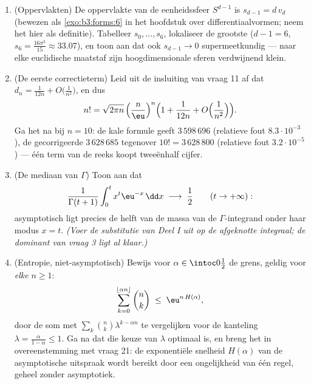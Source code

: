 \begin{problem}
\begin{enumerate}[resume]
        voor $\alpha \neq \frac12$ (zodat binomiaalcoëfficiënten
        buiten het midden exponentieel verwaarloosbaar zijn ten
        opzichte van $2^n$).
  \item (Oppervlakten) De oppervlakte van de eenheidssfeer
        $S^{d-1}$ is $s_{d-1} = d\,v_d$ (bewezen als
        \cref{exo:b3:forms:6} in het hoofdstuk over
        differentiaalvormen; neem het hier als definitie).
        Tabelleer $s_0, \dots, s_6$, lokaliseer de grootste ($d -
        1 = 6$, $s_6 = \frac{16\pi^3}{15} \approx 33.07$), en toon
        aan dat ook $s_{d-1} \to 0$ supermeetkundig --- naar elke
        euclidische maatstaf zijn hoogdimensionale sferen
        verdwijnend klein.
  \item (De eerste correctieterm) Leid uit de insluiting van vraag
        11 af dat $d_n = \frac1{12n} + O\bigl(\frac1{n^2}\bigr)$,
        en dus
        \[
        n! = \sqrt{2\pi n}\,\Bigl(\frac
        n\eu\Bigr)^{n}\Bigl(1 + \frac1{12n} +
        O\Bigl(\frac1{n^2}\Bigr)\Bigr).
        \]
        Ga het na bij $n = 10$: de kale formule geeft
        $3\,598\,696$ (relatieve fout $8.3\cdot10^{-3}$), de
        gecorrigeerde $3\,628\,685$ tegenover $10! =
        3\,628\,800$ (relatieve fout $3.2\cdot10^{-5}$) --- één
        term van de reeks koopt tweeënhalf cijfer.
  \item (De mediaan van $\Gamma$) Toon aan dat
        \[
        \frac{1}{\Gamma(t+1)}
        \int_0^{t} x^{t}\eu^{-x}\,\dd x
        \;\longrightarrow\; \frac12
        \qquad (t \to +\infty) :
        \]
        asymptotisch ligt precies de helft van de massa van de
        $\Gamma$-integrand onder haar modus $x = t$. \emph{(Voer
        de substitutie van Deel I uit op de afgeknotte integraal;
        de dominant van vraag 3 ligt al klaar.)}
  \item (Entropie, niet-asymptotisch) Bewijs voor $\alpha \in
        \intoc0{\frac12}$ de grens, geldig voor \emph{elke} $n
        \geq 1$:
        \[
        \sum_{k=0}^{\lfloor\alpha n\rfloor}\binom nk
        \;\leq\; \eu^{n\,H(\alpha)} ,
        \]
        door de som met $\sum_k\binom nk\lambda^{k-\alpha n}$ te
        vergelijken voor de kanteling $\lambda =
        \frac{\alpha}{1-\alpha} \leq 1$. Ga na dat die keuze van
        $\lambda$ optimaal is, en breng het in overeenstemming met
        vraag 21: de exponentiële snelheid $H(\alpha)$ van de
        asymptotische uitspraak wordt bereikt door een
        ongelijkheid van één regel, geheel zonder asymptotiek.
\end{enumerate}
\end{problem}
